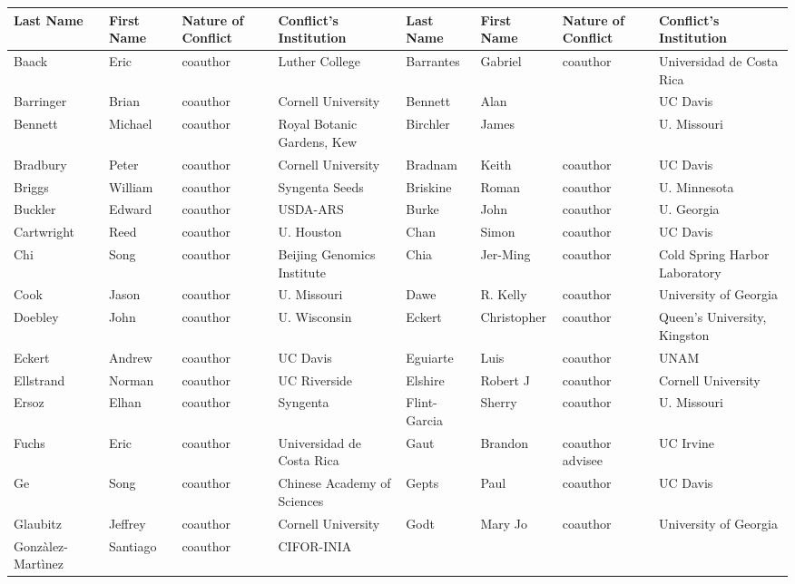 \documentclass[11pt]{article}
\begin{document}
\begin{tiny}
\begin{tabular}{ l l l l l l l l }
{Last Name} & {First Name} & {Nature of Conflict} & {Conflict's Institution}  & {Last Name} & {First Name} & {Nature of Conflict} & {Conflict's Institution}  \\
\hline
Baack &  Eric & coauthor   & Luther College  & Barrantes &  Gabriel & coauthor   & Universidad de Costa Rica \\ 
Barringer &  Brian & coauthor   & Cornell University &
Bennett & Alan &    & UC Davis \\ 
Bennett &  Michael & coauthor   & Royal Botanic Gardens, Kew &
Birchler &  James &    & U. Missouri \\ 
Bradbury & Peter & coauthor   & Cornell University &
Bradnam & Keith & coauthor & UC Davis \\ 
Briggs & William  & coauthor   & Syngenta Seeds &
Briskine & Roman & coauthor   & U. Minnesota \\ 
Buckler & Edward & coauthor   & USDA-ARS &
Burke & John & coauthor   & U. Georgia \\ 
Cartwright &  Reed & coauthor   & U. Houston &
Chan & Simon & coauthor & UC Davis \\ 
Chi & Song & coauthor   & Beijing Genomics Institute &
Chia & Jer-Ming & coauthor   & Cold Spring Harbor Laboratory \\ 
Cook & Jason & coauthor   & U. Missouri &
Dawe & R. Kelly & coauthor   & University of Georgia \\ 
Doebley & John & coauthor   & U. Wisconsin &
Eckert &  Christopher & coauthor   & Queen's University, Kingston \\ 
Eckert & Andrew & coauthor   & UC Davis &
Eguiarte & Luis & coauthor   & UNAM \\ 
Ellstrand &  Norman & coauthor   & UC Riverside &
Elshire & Robert J & coauthor   & Cornell University \\ 
Ersoz & Elhan & coauthor   & Syngenta &
Flint-Garcia & Sherry & coauthor   & U. Missouri \\ 
Fuchs &  Eric & coauthor   & Universidad de Costa Rica &
Gaut &  Brandon & coauthor  advisee & UC Irvine \\ 
Ge &  Song & coauthor   & Chinese Academy of Sciences &
Gepts & Paul & coauthor   & UC Davis \\ 
Glaubitz & Jeffrey & coauthor   & Cornell University &
Godt &  Mary Jo & coauthor   & University of Georgia \\ 
Gonz\`alez-Mart\`inez & Santiago & coauthor   & CIFOR-INIA &

\end{tabular}
\end{tiny}
\end{document}
